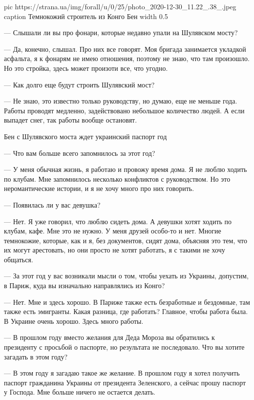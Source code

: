 \ifcmt
  pic https://strana.ua/img/forall/u/0/25/photo_2020-12-30_11.22_.38_.jpeg
	caption Темнокожий строитель из Конго Бен
  width 0.5
\fi


— Слышали ли вы про фонари, которые недавно упали на Шулявском мосту? 

— Да, конечно, слышал. Про них все говорят. Моя бригада занимается
укладкой асфальта, я к фонарям не имею отношения, поэтому не знаю, что там
произошло. Но это стройка, здесь может произоти все, что угодно.  

— Как долго еще будут строить Шулявский мост? 

— Не знаю, это известно только руководству, но думаю, еще не меньше года.
Работы проводят медленно, задействовано небольшое количество людей. А если
выпадет снег, так работы вообще остановят.  

Бен с Шулявского моста ждет украинский паспорт год

— Что вам больше всего запомнилось за этот год? 

— У меня обычная жизнь, я работаю и провожу время дома. Я не люблю ходить
по клубам. Мне запомнилось несколько конфликтов с руководством. Но
это неромантические истории, и я не хочу много про них говорить.  

— Появилась ли у вас девушка? 

— Нет. Я уже говорил, что люблю сидеть дома. А девушки хотят ходить по
клубам, кафе. Мне это не нужно. У меня друзей особо-то и нет. Многие
темнокожие, которые, как и я, без документов, сидят дома, объясняя это
тем, что их могут арестовать, но они просто не хотят работать, я с такими
не хочу общаться.  

— За этот год у вас возникали мысли о том, чтобы уехать из Украины,
допустим, в Париж, куда вы изначально направлялись из Конго? 

— Нет. Мне и здесь хорошо. В Париже также есть безработные и бездомные,
там также есть эмигранты. Какая разница, где работать? Главное, чтобы
работа была. В Украине очень хорошо. Здесь много работы. 

— В прошлом году вместо желания для Деда Мороза вы обратились к президенту
с просьбой о паспорте, но результата не последовало. Что вы хотите
загадать в этом году? 

— В этом году я загадаю такое же желание. В прошлом году я хотел получить
паспорт гражданина Украины от президента Зеленского, а сейчас прошу
паспорт у Господа. Мне больше ничего не остается делать.

